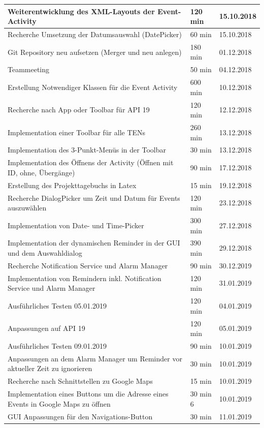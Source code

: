 \begin{longtable}{|p{10cm}|p{2cm}|p{2cm}|}
Weiterentwicklung des XML-Layouts der Event-Activity & 120 min & 15.10.2018\\ \hline
Recherche Umsetzung der Datumsauswahl (DatePicker) & 60 min & 15.10.2018\\ \hline
Git Repository neu aufsetzen (Merger und neu anlegen) & 180 min & 01.12.2018\\ \hline
Teammeeting & 50 min & 04.12.2018\\ \hline
Erstellung Notwendiger Klassen für die Event Activity & 600 min & 10.12.2018 \\ \hline
Recherche nach App oder Toolbar für API 19 & 120 min & 12.12.2018 \\ \hline
Implementation einer Toolbar für alle TENs & 260 min & 13.12.2018 \\ \hline
Implementation des 3-Punkt-Menüs in der Toolbar & 30 min & 13.12.2018 \\ \hline
Implementation des Öffnens der Activity (Öffnen mit ID, ohne, Übergänge) & 90 min &  17.12.2018\\ \hline
Erstellung des Projekttagebuchs in Latex & 15 min & 19.12.2018 \\ \hline
Recherche DialogPicker um Zeit und Datum für Events auszuwählen & 120 min & 23.12.2018 \\ \hline
Implementation von Date- und Time-Picker & 300 min & 27.12.2018 \\ \hline
Implementation der dynamischen Reminder in der GUI und dem Auswahldialog & 390 min & 29.12.2018 \\ \hline
Recherche Notification Service und Alarm Manager & 90 min & 30.12.2019 \\ \hline
Implementation von Remindern inkl. Notification Service und Alarm Manager & 120 min & 31.01.2019 \\ \hline
Ausführliches Testen 05.01.2019 & 120 min & 04.01.2019\\ \hline
Anpassungen auf API 19 & 120 min & 05.01.2019 \\ \hline
Ausführliches Testen 09.01.2019 & 90 min & 10.01.2019\\ \hline
Anpassungen an dem Alarm Manager um Reminder vor aktueller Zeit zu ignorieren & 30 min & 10.01.2019 \\ \hline
Recherche nach Schnittstellen zu Google Maps & 15 min & 10.01.2019 \\ \hline
Implementation eines Buttons um die Adresse eines Events in Google Maps zu öffnen & 30 min 6 & 10.01.2019 \\ \hline
GUI Anpassungen für den Navigations-Button & 30 min & 11.01.2019 \\ \hline

\end{longtable}
